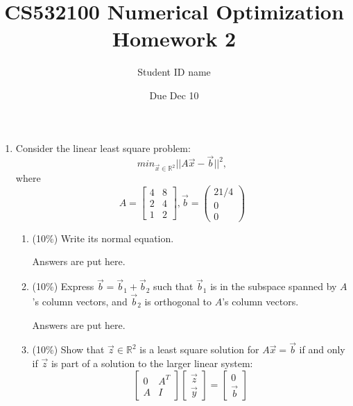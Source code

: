 \documentclass[a4paper,10pt]{article}
\title{CS532100 Numerical Optimization Homework 2}
\author{Student ID name}
\date{Due Dec 10}
\begin{document}
\maketitle
\begin{enumerate}
 \item Consider the linear least square problem:$$min_{\vec{x}\in \mathbb{R}^2}||A\vec{x} - \vec{b}||^2 ,$$ where $$A = \left[ \begin{array}{cc}
    4 & 8 \\ 2 & 4 \\ 1 & 2
    \end{array} \right], \vec{b} = \left(\begin{array}{c} 21/4 \\ 0 \\ 0 \end{array} \right)$$

\begin{enumerate}
		\item (10\%) Write its normal equation.


{\color{blue} Answers are put here. 

    \begin{CJK*}{UTF8}{bsmi}

\end{CJK*}

}



        \item (10\%) Express $\vec{b} = \vec{b}_1 + \vec{b}_2$ such that $\vec{b}_1$ is in the subspace spanned by $A$'s
column vectors, and $\vec{b}_2$ is orthogonal to $A$'s column vectors.

{\color{blue} Answers are put here. 

    \begin{CJK*}{UTF8}{bsmi}
    
\end{CJK*}

}

        \item (10\%) Show that $\vec{z}\in \mathbb{R}^2$ is a least square solution for $A\vec{x}=\vec{b}$ if and only if $\vec{z}$ is part of a solution to the larger linear system:
$$\left[ \begin{array}{cc}
    0 & A^T \\ A & I
    \end{array} \right] \left[\begin{array}{cc} \vec{z} \\ \vec{y} \end{array}\right] = \left[\begin{array}{cc}  0\\ \vec{b}\end{array}\right]$$



\end{enumerate}
\end{enumerate}
\end{document}
